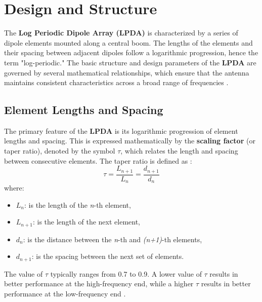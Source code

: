 \documentclass[a4paper, 12pt, english]{article}
\begin{document}
\section{Design and Structure}
The \textbf{Log Periodic Dipole Array (LPDA)} is characterized by a series of dipole elements mounted along a central boom. The lengths of the elements and their spacing between adjacent dipoles follow a logarithmic progression, hence the term "log-periodic." The basic structure and design parameters of the \textbf{LPDA} are governed by several mathematical relationships, which ensure that the antenna maintains consistent characteristics across a broad range of frequencies \cite{balanis2016antenna}\cite{carrel1966design}.

\subsection{Element Lengths and Spacing}
The primary feature of the \textbf{LPDA} is its logarithmic progression of element lengths and spacing. This is expressed mathematically by the \textbf{scaling factor} (or taper ratio), denoted by the symbol $ \tau $, which relates the length and spacing between consecutive elements. The taper ratio is defined as \cite{balanis2016antenna}: 
\[ \tau = \frac{{L}_{n+1}}{{L}_{n}} = \frac{{d}_{n+1}}{{d}_{n}} \]
where:
\begin{itemize}
    \item ${L}_{n}$: is the length of the \textit{n}-th element,
    \item ${L}_{n+1}$: is the length of the next element,
    \item ${d}_{n}$: is the distance between the \textit{n}-th and \textit{(n+1)}-th elements,
    \item ${d}_{n+1}$: is the spacing between the next set of elements.
\end{itemize}
The value of $ \tau $ typically ranges from 0.7 to 0.9. A lower value of $ \tau $ results in better performance at the high-frequency end, while a higher $ \tau $ results in better performance at the low-frequency end \cite{carrel1966design}.
\end{document}
